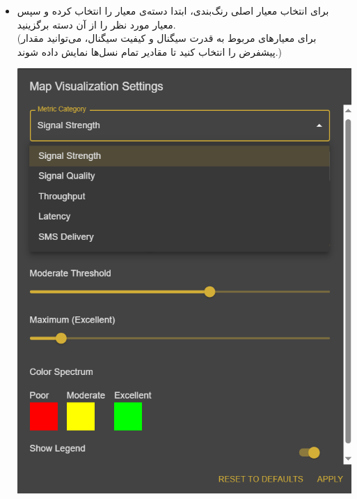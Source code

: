 \begin{itemize}
    \item برای انتخاب معیار اصلی رنگ‌بندی، ابتدا دسته‌ی معیار را انتخاب کرده و سپس معیار مورد نظر را از آن دسته برگزینید.\\
    (برای معیارهای مربوط به قدرت سیگنال و کیفیت سیگنال، می‌توانید مقدار پیشفرض را انتخاب کنید تا مقادیر تمام نسل‌ها نمایش داده شوند.)
    \begin{center}
        \includegraphics[width=\textwidth]{images/settings_metric_catagory.png}
    \end{center}
    \begin{center}

\end{center}
\end{itemize}
